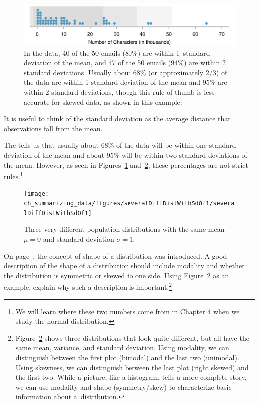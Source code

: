 \begin{figure}
\centering
\includegraphics[width=\textwidth]{ch_summarizing_data/figures/emailCharactersDotPlot/emailCharactersDotPlotStackedRoundedWithSD}
\caption{In the  data, 40 of the 50 emails (80\%) are within 1~standard deviation of the mean, and 47 of the 50 emails (94\%) are within 2 standard deviations. Usually about 68\% (or approximately 2/3) of the data are within 1 standard deviation of the mean and 95\% are within 2 standard deviations, though this rule of thumb is less accurate for skewed data, as shown in this example.}
\label{emailCharactersDotPlotStackedRoundedWithSD}
\end{figure}

\begin{tipBox}{
It is useful to think of the standard deviation as the average distance that observations fall from the mean.}
\end{tipBox}

The  tells us that usually about 68\% of the data will be within one standard deviation of the mean and about 95\% will be within two standard deviations of the mean. However, as seen in Figures~\ref{emailCharactersDotPlotStackedRoundedWithSD} and~\ref{severalDiffDistWithSdOf1}, these percentages are not strict rules.\footnote{We will learn where these two numbers come from in Chapter 4 when we study the normal distribution.}

\begin{figure}
\centering
\texttt{[image: ch\_summarizing\_data/figures/severalDiffDistWithSdOf1/severalDiffDistWithSdOf1]}
\caption{Three very different population distributions with the same mean $\mu=0$ and standard deviation $\sigma=1$.}
\label{severalDiffDistWithSdOf1}
\end{figure}

\begin{exercise}
On page~\pageref{shapeFirstDiscussed}, the concept of shape of a distribution was introduced. A good description of the shape of a distribution should include modality and whether the distribution is symmetric or skewed to one side. Using Figure~\ref{severalDiffDistWithSdOf1} as an example, explain why such a description is important.\footnote{Figure~\ref{severalDiffDistWithSdOf1} shows three distributions that look quite different, but all have the same mean, variance, and standard deviation. Using modality, we can distinguish between the first plot (bimodal) and the last two (unimodal). Using skewness, we can distinguish between the last plot (right skewed) and the first two. While a picture, like a histogram, tells a more complete story, we can use modality and shape (symmetry/skew) to characterize basic information about a~distribution.}
\end{exercise}

